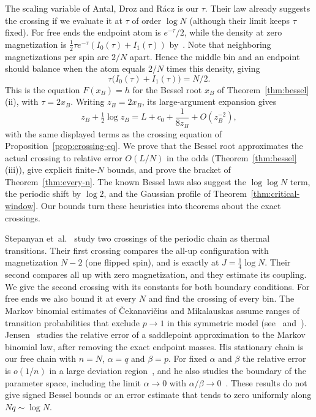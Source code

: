 \documentclass[11pt]{article}
\theoremstyle{definition}
\theoremstyle{remark}
\begin{document}
The scaling variable of Antal, Droz and R\'acz is our $\tau$. Their law
already suggests the crossing if we evaluate it at $\tau$ of order
$\log N$ (although their limit keeps $\tau$ fixed). For free ends the
endpoint atom is $e^{-\tau}/2$, while the density at zero magnetization
is $\frac12\tau e^{-\tau}(I_0(\tau)+I_1(\tau))$
by~\cite[Eq.~(47)]{antal2004}. Note that neighboring magnetizations per
spin are $2/N$ apart. Hence the middle bin and an endpoint should balance
when the atom equals $2/N$ times this density, giving
\[
\tau\bigl(I_0(\tau)+I_1(\tau)\bigr)=N/2.
\]
This is the equation $F(x_B)=h$ for the Bessel root $x_B$ of
Theorem~\ref{thm:bessel}(ii), with $\tau=2x_B$.
Writing $z_B=2x_B$, its large-argument expansion gives
\[
z_B+\tfrac12\log z_B
=L+c_0+\frac1{8z_B}+O(z_B^{-2}),
\]
with the same displayed terms as the crossing equation of
Proposition~\ref{prop:crossing-eq}. We prove that the Bessel root
approximates the actual crossing to relative error $O(L/N)$ in the
odds (Theorem~\ref{thm:bessel}(iii)), give explicit finite-$N$ bounds, and prove the bracket of
Theorem~\ref{thm:every-n}. The known Bessel laws also suggest the
$\log\log N$ term, the periodic shift by $\log2$, and the Gaussian
profile of Theorem~\ref{thm:critical-window}. Our bounds turn these heuristics into theorems about the exact crossings.

Stepanyan et~al.\@~\cite[Section~III.B]{stepanyan2024} study two
crossings of the periodic chain as thermal transitions. Their first
crossing compares the all-up configuration with magnetization $N-2$
(one flipped spin), and is exactly at $J=\frac14\log N$. Their second
compares all up with zero magnetization, and they estimate its
coupling. We give the second crossing with its constants for both
boundary conditions. For free ends we also bound it at every $N$ and
find the crossing of every bin. The Markov binomial estimates of
\v{C}ekanavi\v{c}ius and Mikalauskas assume ranges of transition
probabilities that exclude $p\to1$ in this symmetric model
(see~\cite[Theorems~1.1 to~1.3, pp.~220--221]{cekanavicius2001}
and~\cite[Theorems~1.1 to~1.3, pp.~308--309]{cekanavicius2001ld}).
Jensen~\cite[Section~2]{jensen2013} studies the relative error of a
saddlepoint approximation to the Markov binomial law, after removing the
exact endpoint masses. His stationary chain is our free chain with $n=N$,
$\alpha=q$ and $\beta=p$. For fixed $\alpha$ and $\beta$ the relative error
is $o(1/n)$ in a large deviation region~\cite[Proposition~1]{jensen2013},
and he also studies the boundary of the parameter space, including the
limit $\alpha\to0$ with $\alpha/\beta\to0$~\cite[Proposition~2 and
Eq.~(2.6)]{jensen2013}. These results do not give signed Bessel bounds or
an error estimate that tends to zero uniformly along $Nq\sim\log N$.
\end{document}
